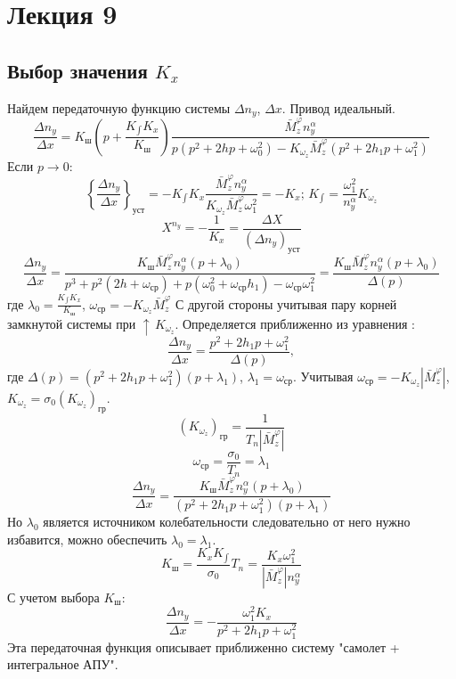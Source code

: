 \documentclass{article}
\begin{document}
\section{Лекция 9}
\subsection{Выбор значения \texorpdfstring{$K_x$}{Lg}}
Найдем передаточную функцию системы $\Delta n_y$, $\Delta x$. Привод идеальный.
\begin{equation}
    \frac{\Delta n_y}{\Delta x} = K_\text{ш} (p + \frac{K_{\int} K_x}{K_\text{ш}}) \frac{\bar{M}_z^{\varphi} n_y^\alpha}{p(p^2 +  2 h p + \omega_0^2) - K_{\omega_z} \bar{M}_z^{\varphi} (p^2 + 2h_{1}p + \omega_1^2)}
\end{equation}
Если $p \rightarrow 0$:
\[
	\left\{ \frac{\Delta n_y}{\Delta x} \right\}_\text{уст}  = -K_{\int}K_x \frac{\bar{M}_z^{\varphi} n_y^\alpha}{K_{\omega_z} \bar{M}_z^{\varphi} \omega_1^2} = -K_x; \, K_{\int} = \frac{\omega_1^2}{n_y^\alpha} K_{\omega_z}
\]
\[
	X^{n_y} = - \frac{1}{K_x} = \frac{\Delta X}{(\Delta n_y)_\text{уст}}
\]
\[
	\frac{\Delta n_y}{\Delta x} = \frac{K_\text{ш} \bar{M}_z^\varphi n_y^\alpha(p + \lambda_0)}{p^3 + p^2 (2h+\omega_\text{ср}) + p (\omega_0^2 + \omega_\text{ср} h_1) - \omega_\text{ср} \omega_1^2} = \frac{K_\text{ш} \bar{M}_z^\varphi n_y^\alpha(p + \lambda_0)}{\Delta(p)}
\]
где $\lambda_0 = \frac{K_{\int} K_x}{K_\text{ш}}$, $\omega_\text{ср} = -K_{\omega_z}\bar{M}_z^\varphi$
С другой стороны учитывая пару корней замкнутой системы при $\uparrow \, K_{\omega_z}$. Определяется приближенно из уравнения :
\[
	\frac{\Delta n_y}{\Delta x} = \frac{p^2 + 2 h_1 p + \omega_1^2}{\Delta(p)},
\]
где $\Delta(p) = (p^2 + 2 h_1 p + \omega_1^2)(p + \lambda_1)$, $\lambda_1 = \omega_\text{ср}$. Учитывая $\omega_\text{ср} = - K_{\omega_z} |\bar{M}_z^\varphi|$, $K_{\omega_z} = \sigma_0 (K_{\omega_z})_\text{гр}$.
\[
	(K_{\omega_z})_\text{гр} = \frac{1}{T_n |\bar{M}_z^\varphi|}
\]
\[
	\omega_\text{ср} = \frac{\sigma_0}{T_n} = \lambda_1
\]
\[
	\frac{\Delta n_y}{\Delta x} = \frac{K_\text{ш} \bar{M}_z^\varphi n_y^\alpha(p + \lambda_0)}{(p^2 + 2h_{1} p + \omega_1^2)(p+\lambda_1)}
\]
Но $\lambda_0$ является источником колебательности следовательно от него нужно избавится, можно обеспечить $\lambda_0 = \lambda_1$.
\[
	K_\text{ш} = \frac{K_{x} K_{\int}}{\sigma_0} T_n = \frac{K_x \omega_1^2}{|\bar{M}_z^\varphi| n_y^\alpha}
\]
С учетом выбора $K_\text{ш}$:
\begin{equation}
	\frac{\Delta n_y}{\Delta x} = -\frac{\omega_1^2 K_x}{p^2 + 2 h_1 p + \omega_1 ^2}
\end{equation}
Эта передаточная функция описывает приближенно систему "самолет + интегральное АПУ".
\end{document}
